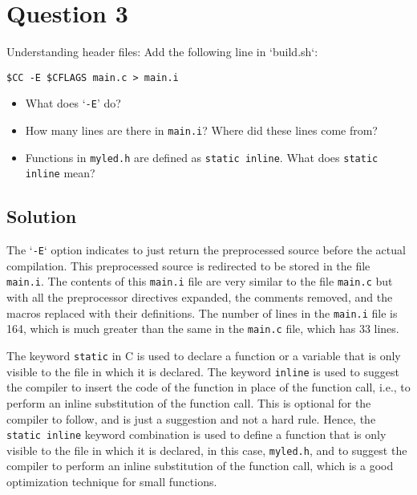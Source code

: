 \section*{Question 3}

Understanding header files:
Add the following line in `build.sh`:
\begin{verbatim}
$CC -E $CFLAGS main.c > main.i
\end{verbatim}
\begin{itemize}[noitemsep]
    \item What does `\texttt{-E}' do?
    \item How many lines are there in \texttt{main.i}? Where did these lines come from?
    \item Functions in \texttt{myled.h} are defined as \texttt{static inline}.
          What does \texttt{static inline} mean?
\end{itemize}

\subsection*{Solution}

The `\texttt{-E}` option indicates to just return the preprocessed source before the actual compilation.
This preprocessed source is redirected to be stored in the file \texttt{main.i}.
The contents of this \texttt{main.i} file are very similar to the file \texttt{main.c} but with all the preprocessor directives expanded, the comments removed, and the macros replaced with their definitions.
The number of lines in the \texttt{main.i} file is 164, which is much greater than the same in the \texttt{main.c} file, which has 33 lines.

The keyword \texttt{static} in C is used to declare a function or a variable that is only visible to the file in which it is declared.
The keyword \texttt{inline} is used to suggest the compiler to insert the code of the function in place of the function call, i.e., to perform an inline substitution of the function call.
This is optional for the compiler to follow, and is just a suggestion and not a hard rule.
Hence, the \texttt{static inline} keyword combination is used to define a function that is only visible to the file in which it is declared, in this case, \texttt{myled.h}, and to suggest the compiler to perform an inline substitution of the function call, which is a good optimization technique for small functions.
